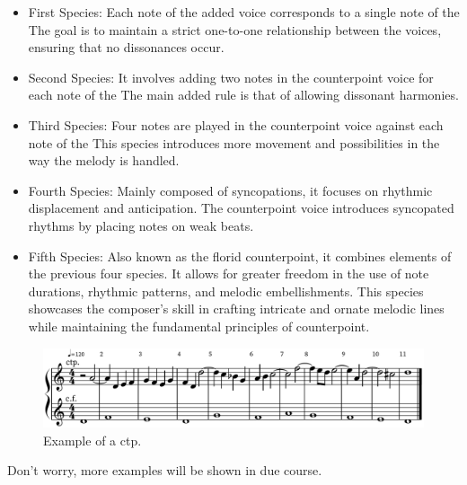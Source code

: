 \begin{itemize}[wide]
    \item First Species: Each note of the added voice corresponds to a single note of the \cfdot The goal is to maintain a strict one-to-one relationship between the voices, ensuring that no dissonances occur.
    \item Second Species: It involves adding two notes in the counterpoint voice for each note of the \cfdot The main added rule is that of allowing dissonant harmonies.
    \item Third Species: Four notes are played in the counterpoint voice against each note of the \cfdot This species introduces more movement and possibilities in the way the melody is handled.
    \item Fourth Species: Mainly composed of syncopations, it focuses on rhythmic displacement and anticipation. The counterpoint voice introduces syncopated rhythms by placing notes on weak beats.
    \item Fifth Species: Also known as the florid counterpoint, it combines elements of the previous four species. It allows for greater freedom in the use of note durations, rhythmic patterns, and melodic embellishments. This species showcases the composer's skill in crafting intricate and ornate melodic lines while maintaining the fundamental principles of counterpoint.
\end{itemize}

\begin{figure}[h]
    \centering
    \includegraphics[height=\fhs]{Images/fux_5spA.png}
    \caption{Example of a  ctp.  }
\end{figure}

Don't worry, more examples will be shown in due course.

